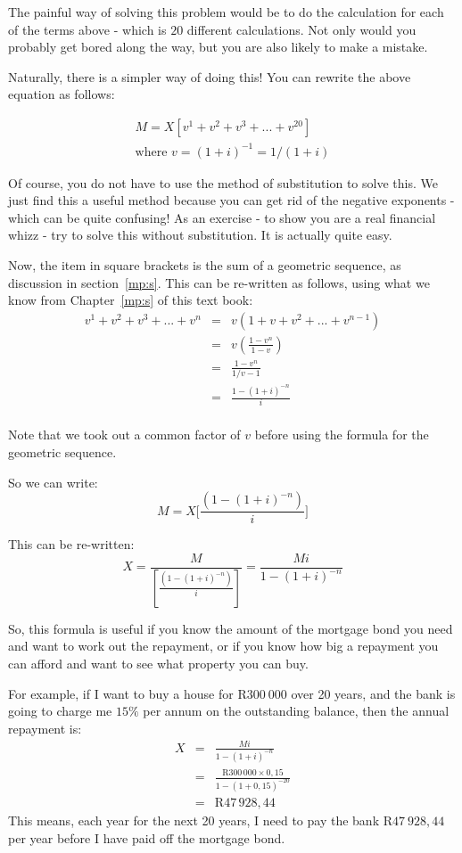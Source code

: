 The painful way of solving this problem would be to do the calculation for each of the terms above - which is $20$ different calculations. Not only would you probably get bored along the way, but you are also likely to make a mistake.

Naturally, there is a simpler way of doing this! You can rewrite the above equation as follows:

\begin{eqnarray*}
M = X[v^1 + v^2 + v^3 + ... + v^{20}]\\
\mbox{where $v = (1+i)^{-1} = 1/(1+i)$}
\end{eqnarray*}

Of course, you do not have to use the method of substitution to solve this. We just find this a useful method because you can get rid of the negative exponents - which can be quite confusing! As an exercise - to show you are a real financial whizz - try to solve this without substitution. It is actually quite easy.

Now, the item in square brackets is the sum of a geometric sequence, as discussion in section~\ref{mp:s}. This can be re-written as follows, using what we know from Chapter~\ref{mp:s} of this text book:
\begin{eqnarray*}
v^1 + v^2 + v^3 + ... + v^n &=& v(1 + v + v^2 + ... + v^{n-1})\\
&=& v\left(\frac{1 - v^n}{1-v}\right)\\
&=& \frac{1 - v^n}{1/v-1}\\
&=& \frac{1-(1+i)^{-n}}{i}\\
\end{eqnarray*}

Note that we took out a common factor of $v$ before using the formula for the geometric sequence.

So we can write:
\begin{equation*}
M = X \biggl[\frac{(1-(1+i)^{-n})}{i}\biggr]
\end{equation*}

This can be re-written:
\begin{equation*}
X = \frac{M}{[\frac{(1-(1+i)^{-n})}{i}]} = \frac{Mi}{1-(1+i)^{-n}}
\end{equation*}

So, this formula is useful if you know the amount of the mortgage bond you need and want to work out the repayment, or if you know how big a repayment you can afford and want to see what property you can buy.

For example, if I want to buy a house for R$300~000$ over 20 years, and the bank is going to charge me $15\%$ per annum on the outstanding balance, then the annual repayment is:
\begin{eqnarray*}
X &=& \frac{Mi}{1-(1+i)^{-n}}\\
&=& \frac{\mbox{R}300\,000 \times 0,15}{1-(1+0,15)^{-20}}\\
&=& \mbox{R}47\,928,44
\end{eqnarray*}
This means, each year for the next 20 years, I need to pay the bank R$47~928,44$ per year before I have paid off the mortgage bond. 

